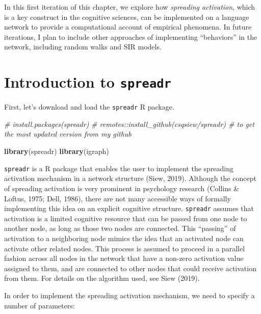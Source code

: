 \documentclass[
]{book}
\newenvironment{Shaded}{\begin{snugshade}}{\end{snugshade}}
\newcommand{\CommentTok}[1]{\textcolor[rgb]{0.56,0.35,0.01}{\textit{#1}}}
\newcommand{\FunctionTok}[1]{\textcolor[rgb]{0.13,0.29,0.53}{\textbf{#1}}}
\newcommand{\NormalTok}[1]{#1}
\begin{document}
In this first iteration of this chapter, we explore how \emph{spreading activation}, which is a key construct in the cognitive sciences, can be implemented on a language network to provide a computational account of empirical phenomena. In future iterations, I plan to include other approaches of implementing ``behaviors'' in the network, including random walks and SIR models.

\section{\texorpdfstring{Introduction to \texttt{spreadr}}{Introduction to spreadr}}\label{introduction-to-spreadr}

First, let's download and load the \texttt{spreadr} R package.

\begin{Shaded}
\begin{Highlighting}[]
\CommentTok{\# install.packages(\textquotesingle{}spreadr\textquotesingle{})}
\CommentTok{\# remotes::install\_github(\textquotesingle{}csqsiew/spreadr\textquotesingle{}) \# to get the most updated version from my github }

\FunctionTok{library}\NormalTok{(spreadr)}
\FunctionTok{library}\NormalTok{(igraph)}
\end{Highlighting}
\end{Shaded}

\texttt{spreadr} is a R package that enables the user to implement the spreading activation mechanism in a network structure (Siew, 2019). Although the concept of spreading activation is very prominent in psychology research (Collins \& Loftus, 1975; Dell, 1986), there are not many accessible ways of formally implementing this idea on an explicit cognitive structure. \texttt{spreadr} assumes that activation is a limited cognitive resource that can be passed from one node to another node, as long as those two nodes are connected. This ``passing'' of activation to a neighboring node mimics the idea that an activated node can activate other related nodes. This process is assumed to proceed in a parallel fashion across all nodes in the network that have a non-zero activation value assigned to them, and are connected to other nodes that could receive activation from them. For details on the algorithm used, see Siew (2019).

In order to implement the spreading activation mechanism, we need to specify a number of parameters:
\end{document}
